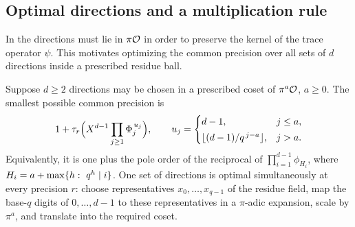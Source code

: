 \subsection{Optimal directions and a multiplication rule}\label{lub:ssec:directions}
\begingroup\raggedright{}\endgroup

In \cite[Theorem~4.6]{BergerSprang2025Integer} the directions must lie in $\pi\mathcal{O}$ in order
to preserve the kernel of the trace operator $\psi$. This motivates optimizing the common
precision over all sets of $d$ directions inside a prescribed residue ball.

\begin{theorem}\label{lub:thm:directions}
Suppose $d\ge2$ directions may be chosen in a prescribed coset of $\pi^a\mathcal{O}$, $a\ge0$. The
smallest possible common precision is
\begin{equation}\label{lub:eq:minimax}
 1+\tau_r\Bigl(X^{d-1}\prod_{j\ge1}\Phi_j^{\,u_j}\Bigr),\qquad
 u_j=\begin{cases} d-1,& j\le a,\\[2pt] \lfloor(d-1)/q^{\,j-a}\rfloor,& j>a.\end{cases}
\end{equation}
Equivalently, it is one plus the pole order of the reciprocal of
$\prod_{i=1}^{d-1}\phi_{H_i}$, where $H_i=a+\max\{h:\ q^h\mid i\}$. One set of directions
is optimal simultaneously at every precision $r$: choose representatives
$x_0,\dots,x_{q-1}$ of the residue field, map the base-$q$ digits of $0,\dots,d-1$ to these
representatives in a $\pi$-adic expansion, scale by $\pi^a$, and translate into the
required coset.
\end{theorem}
